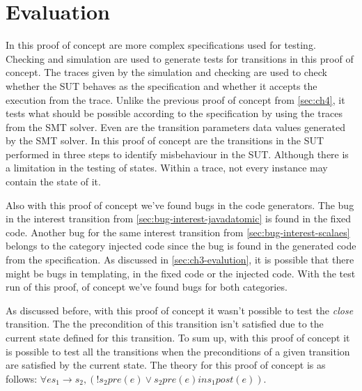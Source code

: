 
\section{Evaluation}\label{sec:ch5-evaluation}

In this proof of concept are more complex specifications used for testing.
Checking and simulation are used to generate tests for transitions in this proof
of concept. The traces given by the simulation and checking are used to check
whether the SUT behaves as the specification and whether it accepts the
execution from the trace. Unlike the previous proof of concept from
\autoref{sec:ch4}, it tests what should be possible according to the
specification by using the traces from the SMT solver. Even are the transition
parameters data values generated by the SMT solver. In this proof of concept are
the transitions in the SUT performed in three steps to identify misbehaviour in
the SUT. Although there is a limitation in the testing of states. Within a
trace, not every instance may contain the state of it.

Also with this proof of concept we've found bugs in the code generators. The bug
in the interest transition from \autoref{sec:bug-interest-javadatomic} is found
in the fixed code. Another bug for the same interest transition from
\autoref{sec:bug-interest-scalaes} belongs to the category injected code since
the bug is found in the generated code from the specification. As discussed in
\autoref{sec:ch3-evalution}, it is possible that there might be bugs in
templating, in the fixed code or the injected code. With the test run of this
proof, of concept we've found bugs for both categories.

As discussed before, with this proof of concept it wasn't possible to test the
\textit{close} transition. The the precondition of this transition isn't
satisfied due to the current state defined for this transition. To sum up, with
this proof of concept it is possible to test all the transitions when the
preconditions of a given transition are satisfied by the current state. The
theory for this proof of concept is as follows:
$\forall e s_{1} \to s_{2}, (! s_{2} pre(e) \lor s_{2} pre(e) in s_{1} post(e))$.



